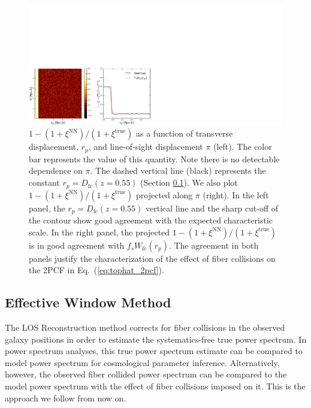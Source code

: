 \begin{figure}
\begin{center}
\includegraphics[scale=0.3]{figs/fc/2pcf_Nseries_upweighted_5mocks_5x5_tophat.pdf} 
\caption{$1 - (1 + \xi^\mathrm{NN})/(1+\xi^\mathrm{true})$ as a 
function of transverse displacement, $r_p$, and line-of-sight 
displacement $\pi$ (left). The color bar represents the value of this quantity. Note there is no detectable dependence on $\pi$.
The dashed vertical line (black) represents the constant 
$r_p = D_\mathrm{fc}(z=0.55)$ (Section \ref{sec:fourier}). 
We also plot $1 - (1 + \xi^\mathrm{NN})/(1+\xi^\mathrm{true})$
projected along $\pi$ (right). In the left panel, the $r_p = D_\mathrm{fc}(z=0.55)$ 
vertical line and the sharp cut-off of the contour show good agreement with the expected characteristic scale. 
In the right panel, the projected $1 - (1 + \xi^\mathrm{NN})/(1+\xi^\mathrm{true})$
is in good agreement with $f_s W_\mathrm{fc}(r_p)$. The agreement in both panels
justify the characterization of the effect of fiber collisions on the 2PCF in 
Eq.~(\ref{eq:tophat_2pcf}).}
\label{fig:2pcf_tophat}
\end{center}
\end{figure}
\subsection{Effective Window Method} \label{sec:fourier}
The LOS Reconstruction method corrects for fiber collisions in the observed galaxy positions 
in order to estimate the systematics-free true power 
spectrum. In power spectrum analyses, this true power spectrum estimate
can be compared to model power spectrum for cosmological parameter inference. 
Alternatively, however, the observed fiber collided power spectrum can be 
compared to the model power spectrum with the effect of fiber collisions imposed 
on it. This is the approach we follow from now on.

